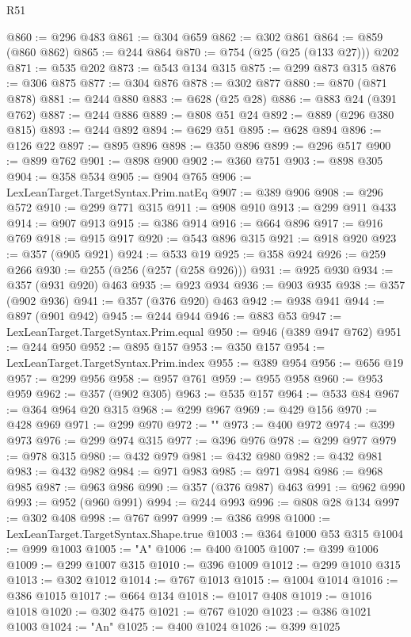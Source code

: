 \begin{lexlean}{R51}
\begin{coremodule}
@860 := @296 @483
@861 := @304 @659
@862 := @302 @861
@864 := @859 (@860 @862)
@865 := @244 @864
@870 := @754 (@25 (@25 (@133 @27))) @202
@871 := @535 @202
@873 := @543 @134 @315
@875 := @299 @873 @315
@876 := @306 @875
@877 := @304 @876
@878 := @302 @877
@880 := @870 (@871 @878)
@881 := @244 @880
@883 := @628 (@25 @28)
@886 := @883 @24 (@391 @762)
@887 := @244 @886
@889 := @808 @51 @24
@892 := @889 (@296 @380 @815)
@893 := @244 @892
@894 := @629 @51
@895 := @628 @894
@896 := @126 @22
@897 := @895 @896
@898 := @350 @896
@899 := @296 @517
@900 := @899 @762
@901 := @898 @900
@902 := @360 @751
@903 := @898 @305
@904 := @358 @534
@905 := @904 @765
@906 := LexLeanTarget.TargetSyntax.Prim.natEq
@907 := @389 @906
@908 := @296 @572
@910 := @299 @771 @315
@911 := @908 @910
@913 := @299 @911 @433
@914 := @907 @913
@915 := @386 @914
@916 := @664 @896
@917 := @916 @769
@918 := @915 @917
@920 := @543 @896 @315
@921 := @918 @920
@923 := @357 (@905 @921)
@924 := @533 @19
@925 := @358 @924
@926 := @259 @266
@930 := @255 (@256 (@257 (@258 @926)))
@931 := @925 @930
@934 := @357 (@931 @920) @463
@935 := @923 @934
@936 := @903 @935
@938 := @357 (@902 @936)
@941 := @357 (@376 @920) @463
@942 := @938 @941
@944 := @897 (@901 @942)
@945 := @244 @944
@946 := @883 @53
@947 := LexLeanTarget.TargetSyntax.Prim.equal
@950 := @946 (@389 @947 @762)
@951 := @244 @950
@952 := @895 @157
@953 := @350 @157
@954 := LexLeanTarget.TargetSyntax.Prim.index
@955 := @389 @954
@956 := @656 @19
@957 := @299 @956
@958 := @957 @761
@959 := @955 @958
@960 := @953 @959
@962 := @357 (@902 @305)
@963 := @535 @157
@964 := @533 @84
@967 := @364 @964 @20 @315
@968 := @299 @967
@969 := @429 @156
@970 := @428 @969
@971 := @299 @970
@972 := ""
@973 := @400 @972
@974 := @399 @973
@976 := @299 @974 @315
@977 := @396 @976
@978 := @299 @977
@979 := @978 @315
@980 := @432 @979
@981 := @432 @980
@982 := @432 @981
@983 := @432 @982
@984 := @971 @983
@985 := @971 @984
@986 := @968 @985
@987 := @963 @986
@990 := @357 (@376 @987) @463
@991 := @962 @990
@993 := @952 (@960 @991)
@994 := @244 @993
@996 := @808 @28 @134
@997 := @302 @408
@998 := @767 @997
@999 := @386 @998
@1000 := LexLeanTarget.TargetSyntax.Shape.true
@1003 := @364 @1000 @53 @315
@1004 := @999 @1003
@1005 := "A"
@1006 := @400 @1005
@1007 := @399 @1006
@1009 := @299 @1007 @315
@1010 := @396 @1009
@1012 := @299 @1010 @315
@1013 := @302 @1012
@1014 := @767 @1013
@1015 := @1004 @1014
@1016 := @386 @1015
@1017 := @664 @134
@1018 := @1017 @408
@1019 := @1016 @1018
@1020 := @302 @475
@1021 := @767 @1020
@1023 := @386 @1021 @1003
@1024 := "An"
@1025 := @400 @1024
@1026 := @399 @1025

\end{coremodule}
\end{lexlean}
